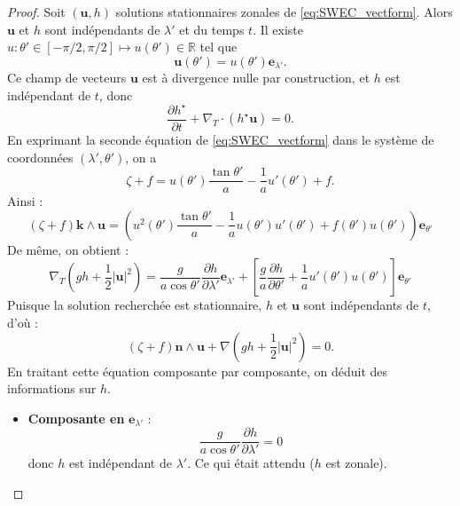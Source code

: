 \begin{proof}
Soit $(\mathbf{u}, h)$ solutions stationnaires zonales de \eqref{eq:SWEC_vectform}. Alors $\mathbf{u}$ et $h$ sont indépendants de $\lambda'$ et du temps $t$. Il existe $u : \theta' \in [-\pi/2, \pi/2] \mapsto u(\theta') \in \mathbb{R}$ tel que
\begin{equation}
\mathbf{u}(\theta') = u(\theta')\mathbf{e}_{\lambda'}.
\end{equation}
Ce champ de vecteurs $\mathbf{u}$ est à divergence nulle par construction, et $h$ est indépendant de $t$, donc
\begin{equation}
\dfrac{\partial h^{\star}}{\partial t} + \nabla_T \cdot (h^{\star} \mathbf{u}) = 0.
\end{equation}
En exprimant la seconde équation de \eqref{eq:SWEC_vectform} dans le système de coordonnées $(\lambda',\theta')$, on a
\begin{equation}
\zeta + f = u(\theta') \dfrac{\tan \theta'}{a} - \dfrac{1}{a} u'(\theta') + f.
\end{equation}
Ainsi :
\begin{equation}
\left( \zeta + f \right) \mathbf{k} \wedge \mathbf{u} = \left( u^2 (\theta') \dfrac{\tan \theta'}{a} - \dfrac{1}{a} u(\theta') u'(\theta') + f(\theta') u(\theta') \right) \mathbf{e}_{\theta'}
\end{equation}
De même, on obtient :
\begin{equation}
\nabla_T \left( gh + \dfrac{1}{2} |\mathbf{u}|^2 \right) = \dfrac{g}{a \cos \theta'} \dfrac{\partial h}{\partial \lambda'} \mathbf{e}_{\lambda'} + \left[ \dfrac{g}{a} \dfrac{\partial h}{\partial \theta'} + \dfrac{1}{a} u'(\theta') u(\theta') \right] \mathbf{e}_{\theta'}
\end{equation}
Puisque la solution recherchée est stationnaire, $h$ et $\mathbf{u}$ sont indépendants de $t$, d'où :
\begin{equation}
\left( \zeta + f \right) \mathbf{n} \wedge \mathbf{u} + \nabla \left( gh + \dfrac{1}{2} |\mathbf{u}|^2 \right) = 0.
\end{equation}
En traitant cette équation composante par composante, on déduit des informations sur $h$.
\begin{itemize}
\item \textbf{Composante en} $\mathbf{e}_{\lambda'}$ : 
\begin{equation}
\dfrac{g}{a \cos \theta'} \dfrac{\partial h}{\partial \lambda'} = 0
\end{equation}
donc $h$ est indépendant de $\lambda'$. Ce qui était attendu ($h$ est zonale).


\end{itemize}
\end{proof}
